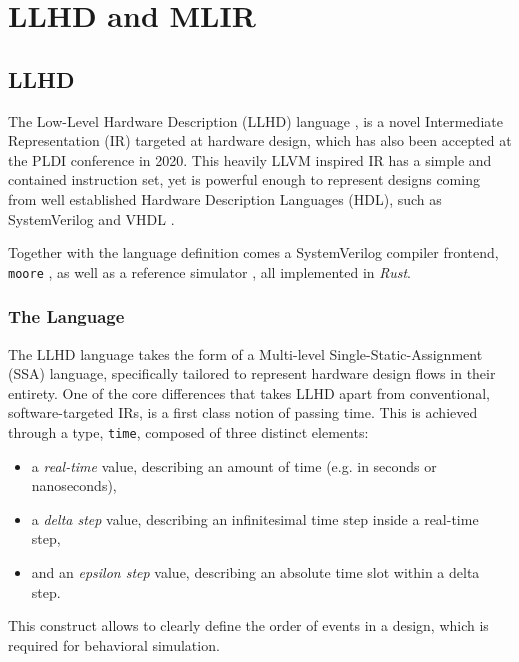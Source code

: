 \chapter{LLHD and MLIR}
\label{ch:ir}


\section{LLHD}
\label{section:llhd}
The Low-Level Hardware Description (LLHD) language \cite{Schuiki2020, llhd.io}, is a novel Intermediate Representation (IR) targeted at hardware design, which has also been accepted at the PLDI conference in 2020. This heavily LLVM inspired IR has a simple and contained instruction set, yet is powerful enough to represent designs coming from well established Hardware Description Languages (HDL), such as SystemVerilog \cite{SV2018} and VHDL \cite{VHDL2009}.

Together with the language definition comes a SystemVerilog compiler frontend, \texttt{moore} \cite{moore}, as well as a reference simulator \cite{llhd-sim}, all implemented in \textit{Rust}.


\subsection{The Language}
The LLHD language takes the form of a Multi-level Single-Static-Assignment (SSA) \cite{Alpern1988} language, specifically tailored to represent hardware design flows in their entirety.
One of the core differences that takes LLHD apart from conventional, software-targeted IRs, is a first class notion of passing time. This is achieved through a type, \texttt{time}, composed of three distinct elements:

\begin{itemize}
    \item a \textit{real-time} value, describing an amount of time (e.g. in seconds or nanoseconds),
    \item a \textit{delta step} value, describing an infinitesimal time step inside a real-time step,
    \item and an \textit{epsilon step} value, describing an absolute time slot within a delta step.
\end{itemize}

This construct allows to clearly define the order of events in a design, which is required for behavioral simulation.

